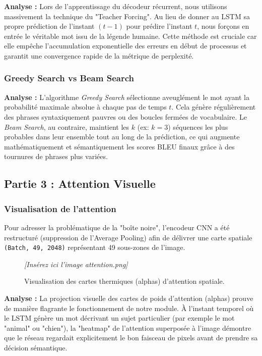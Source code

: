 \documentclass[12pt, a4paper]{article}
\begin{document}
\textbf{Analyse :} Lors de l'apprentissage du décodeur récurrent, nous utilisons massivement la technique du "Teacher Forcing". Au lieu de donner au LSTM sa propre prédiction de l'instant $(t-1)$ pour prédire l'instant $t$, nous forçons en entrée le véritable mot issu de la légende humaine. Cette méthode est cruciale car elle empêche l'accumulation exponentielle des erreurs en début de processus et garantit une convergence rapide de la métrique de perplexité.

\subsubsection*{Greedy Search vs Beam Search}
\textbf{Analyse :} L'algorithme \textit{Greedy Search} sélectionne aveuglément le mot ayant la probabilité maximale absolue à chaque pas de temps $t$. Cela génère régulièrement des phrases syntaxiquement pauvres ou des boucles fermées de vocabulaire. Le \textit{Beam Search}, au contraire, maintient les $k$ (ex: $k=3$) séquences les plus probables dans leur ensemble tout au long de la prédiction, ce qui augmente mathématiquement et sémantiquement les scores BLEU finaux grâce à des tournures de phrases plus variées.

\subsection{Partie 3 : Attention Visuelle}

\subsubsection*{Visualisation de l'attention}
Pour adresser la problématique de la "boîte noire", l'encodeur CNN a été restructuré (suppression de l'Average Pooling) afin de délivrer une carte spatiale \texttt{(Batch, 49, 2048)} représentant 49 sous-zones de l'image.

\begin{figure}[H]
    \centering
    \textit{[Insérez ici l'image attention.png]}
    \caption{Visualisation des cartes thermiques (alphas) d'attention spatiale.}
\end{figure}

\textbf{Analyse :} La projection visuelle des cartes de poids d'attention (alphas) prouve de manière flagrante le fonctionnement de notre module. À l'instant temporel où le LSTM génère un mot décrivant un sujet particulier (par exemple le mot "animal" ou "chien"), la "heatmap" de l'attention superposée à l'image démontre que le réseau regardait explicitement le bon faisceau de pixels avant de prendre sa décision sémantique.
\end{document}
